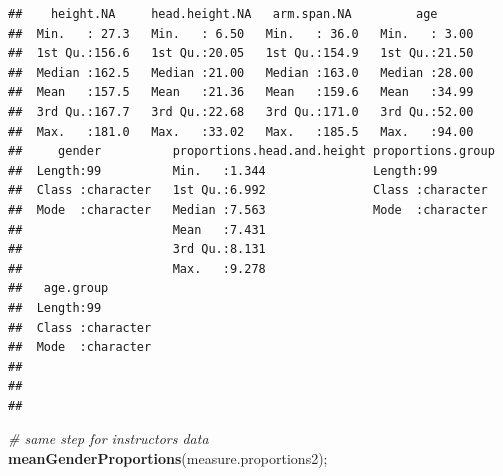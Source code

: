 \documentclass[]{article}
\newenvironment{Shaded}{\begin{snugshade}}{\end{snugshade}}
\newcommand{\CommentTok}[1]{\textcolor[rgb]{0.56,0.35,0.01}{\textit{#1}}}
\newcommand{\KeywordTok}[1]{\textcolor[rgb]{0.13,0.29,0.53}{\textbf{#1}}}
\newcommand{\NormalTok}[1]{#1}
\begin{document}
\begin{verbatim}
##    height.NA     head.height.NA   arm.span.NA         age       
##  Min.   : 27.3   Min.   : 6.50   Min.   : 36.0   Min.   : 3.00  
##  1st Qu.:156.6   1st Qu.:20.05   1st Qu.:154.9   1st Qu.:21.50  
##  Median :162.5   Median :21.00   Median :163.0   Median :28.00  
##  Mean   :157.5   Mean   :21.36   Mean   :159.6   Mean   :34.99  
##  3rd Qu.:167.7   3rd Qu.:22.68   3rd Qu.:171.0   3rd Qu.:52.00  
##  Max.   :181.0   Max.   :33.02   Max.   :185.5   Max.   :94.00  
##     gender          proportions.head.and.height proportions.group 
##  Length:99          Min.   :1.344               Length:99         
##  Class :character   1st Qu.:6.992               Class :character  
##  Mode  :character   Median :7.563               Mode  :character  
##                     Mean   :7.431                                 
##                     3rd Qu.:8.131                                 
##                     Max.   :9.278                                 
##   age.group        
##  Length:99         
##  Class :character  
##  Mode  :character  
##                    
##                    
## 
\end{verbatim}

\begin{Shaded}
\begin{Highlighting}[]
\CommentTok{\# same step for instructors data}
\KeywordTok{meanGenderProportions}\NormalTok{(measure.proportions2);}
\end{Highlighting}
\end{Shaded}
\end{document}
